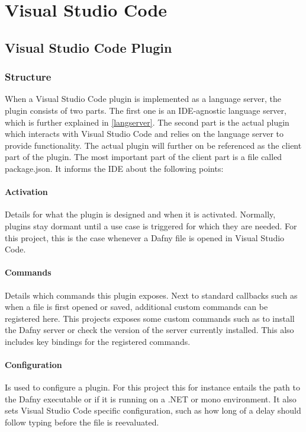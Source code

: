 \section{Visual Studio Code}

\subsection{Visual Studio Code Plugin}
\subsubsection{Structure}
When a Visual Studio Code plugin is implemented as a language server, the plugin consists of two parts. The first one is an IDE-agnostic language server, which is further explained in \ref{langserver}. The second part is the actual plugin which interacts with Visual Studio Code and relies on the language server to provide functionality. \newline
The actual plugin will further on be referenced as the client part of the plugin. The most important part of the client part is a file called package.json. It informs the IDE about the following points:
\paragraph{Activation}
Details for what the plugin is designed and when it is activated. Normally, plugins stay dormant until a use case is triggered for which they are needed. For this project, this is the case whenever a Dafny file is opened in Visual Studio Code.

\paragraph{Commands}
Details which commands this plugin exposes. Next to standard callbacks such as when a file is first opened or saved, additional custom commands can be registered here. This projects exposes some custom commands such as to install the Dafny server or check the version of the server currently installed. This also includes key bindings for the registered commands.

\paragraph{Configuration}
Is used to configure a plugin. For this project this for instance entails the path to the Dafny executable or if it is running on a .NET or mono environment. It also sets Visual Studio Code specific configuration, such as how long of a delay should follow typing before the file is reevaluated.

